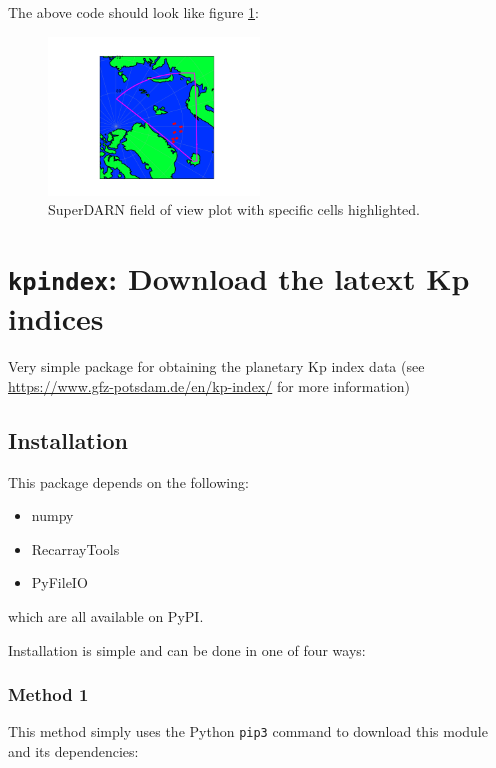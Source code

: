 				The above code should look like figure \ref{FigSDFOV}:
			
				\begin{figure}
					\centering\includegraphics[width=0.5\textwidth]{figures/ch05_sdfov.png}
					\caption{SuperDARN field of view plot with specific cells highlighted.\label{FigSDFOV}}
					
				\end{figure}
			


	\section{\texttt{kpindex}: Download the latext Kp indices}

	Very simple package for obtaining the planetary Kp index data (see 
	\url{https://www.gfz-potsdam.de/en/kp-index/} for more information)
	
	\subsection{Installation}
	
	This package depends on the following:
	
	\begin{itemize}
	  \item numpy
	  \item RecarrayTools
	  \item PyFileIO
	\end{itemize}
	
	which are all available on PyPI.
	
	Installation is simple and can be done in one of four ways:
	
	\subsubsection{Method 1}
	
	This method simply uses the Python \texttt{pip3} command to download this 
	module and its dependencies:
	
